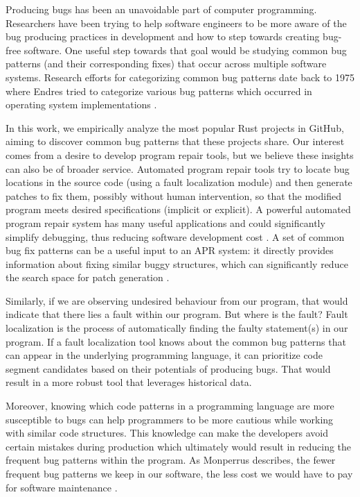Producing bugs has been an unavoidable part of computer programming. Researchers have been trying to help software engineers to be more aware of the bug producing practices in development and how to step towards creating bug-free software. One useful step towards that goal would be studying common bug patterns (and their corresponding fixes) that occur across multiple software systems. Research efforts for categorizing common bug patterns date back to 1975 where Endres tried to categorize various bug patterns which occurred in operating system implementations \cite{endres1975analysis}.  

In this work, we empirically analyze the most popular Rust projects in GitHub, aiming to discover common bug patterns that these projects share. Our interest comes from a desire to develop program repair tools, but we believe these insights can also be of broader service. Automated program repair \cite{goues2019automated} \cite{liu2018survey} tools try to locate bug locations in the source code (using a fault localization module) and then generate patches to fix them, possibly without human intervention, so that the modified program meets desired specifications (implicit or explicit). A powerful automated program repair system has many useful applications and could significantly simplify debugging, thus reducing software development cost \cite{le2012systematic}. A set of common bug fix patterns can be a useful input to an APR system: it directly provides information about fixing similar buggy structures, which can significantly reduce the search space for patch generation \cite{jeffrey2009bugfix}. 

Similarly, if we are observing undesired behaviour from our program, that would indicate that there lies a fault within our program. But where is the fault? Fault localization \cite{wong2016survey} is the process of automatically finding the faulty statement(s) in our program. If a fault localization tool knows about the common bug patterns that can appear in the underlying programming language, it can prioritize code segment candidates based on their potentials of producing bugs. That would result in a more robust tool that leverages historical data.

Moreover, knowing which code patterns in a programming language are more susceptible to bugs can help programmers to be more cautious while working with similar code structures. This knowledge can make the developers avoid certain mistakes during production which ultimately would result in reducing the frequent bug patterns within the program. As Monperrus describes, the fewer frequent bug patterns we keep in our software, the less cost we would have to pay for software maintenance \cite{monperrus2014critical}.


